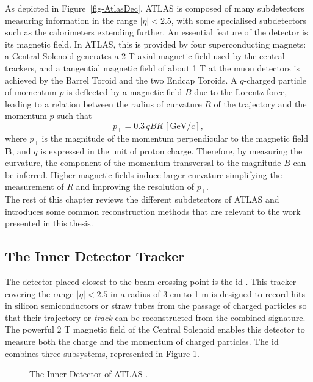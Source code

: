 As depicted in Figure~\ref{fig-AtlasDec}, ATLAS is composed of many subdetectors measuring information in the range $|\eta|<  2.5$, with some specialised subdetectors such as the calorimeters extending further. An essential feature of the detector is its magnetic field. In ATLAS, this is provided by four superconducting magnets: a Central Solenoid generates a 2 T axial magnetic field used by the central trackers, and a tangential magnetic field of about 1 T at the muon detectors is achieved by the Barrel Toroid and the two Endcap Toroids. A $q$-charged particle of momentum $p$ is deflected by a magnetic field $B$ due to the Lorentz force, leading to a relation between the radius of curvature $R$ of the trajectory and the momentum $p$ such that 
\begin{equation}
  p_{\perp} = 0.3 \, qBR \, [\text{GeV}/c],
\end{equation}
where $p_{\perp}$ is the magnitude of the momentum perpendicular to the magnetic field $\boldsymbol{B}$, and $q$ is expressed in the unit of proton charge. Therefore, by measuring the curvature, the component of the momentum transversal to the magnitude $B$ can be inferred. Higher magnetic fields induce larger curvature simplifying the measurement of $R$ and improving the resolution of $p_{\perp}$. \\ 

The rest of this chapter reviews the different subdetectors of ATLAS and introduces some common reconstruction methods that are relevant to the work presented in this thesis. 

\subsection{The Inner Detector Tracker}
The detector placed closest to the beam crossing point is the \gls{id} \cite{CERN-LHCC-97-016}. This tracker covering the range $|\eta| < 2.5$ in a radius of 3 cm to 1 m is designed to record hits in silicon semiconductors or straw tubes from the passage of charged particles so that their trajectory or \textit{track} can be reconstructed from the combined signature. The powerful 2 T magnetic field of the Central Solenoid enables this detector to measure both the charge and the momentum of charged particles. The \gls{id} combines three subsystems, represented in Figure \ref{fig-AtlasDecID}. 

\begin{figure}[!h]
  \centering
  \hspace{-1.25cm}
  \caption{The Inner Detector of ATLAS \cite{ATLASschematics}.}
  \label{fig-AtlasDecID}
\end{figure}

